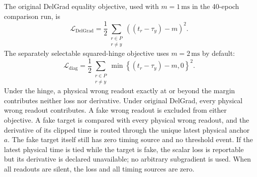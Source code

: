 The original DelGrad equality objective, used with
$m=1\,\mathrm{ms}$ in the 40-epoch comparison run, is
\begin{equation}
    \mathcal L_{\mathrm{DelGrad}}
      =\frac12\sum_{\substack{r\in P\\r\ne y}}
        \left((t_r-\tau_y)-m\right)^2.
    \label{eq:tes-masked-delgrad}
\end{equation}
The separately selectable squared-hinge objective uses
$m=2\,\mathrm{ms}$ by default:
\begin{equation}
    \mathcal L_{\mathrm{diag}}
      =\frac12\sum_{\substack{r\in P\\r\ne y}}
        \min\!\left\{(t_r-\tau_y)-m,0\right\}^2.
    \label{eq:tes-masked-squared-hinge}
\end{equation}
Under the hinge, a physical wrong readout exactly at or beyond the margin
contributes neither loss nor derivative. Under original DelGrad, every
physical wrong readout contributes. A fake wrong readout is excluded from
either objective. A fake
target is compared with every physical wrong readout, and the derivative of
its clipped time is routed through the unique latest physical anchor $a$.
The fake target itself still has zero timing source and no threshold event.
If the latest physical time is tied while the target is fake, the scalar loss
is reportable but its derivative is declared unavailable; no arbitrary
subgradient is used.  When all readouts are silent, the loss and
all timing sources are zero.


